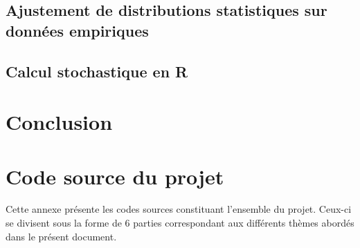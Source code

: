 \documentclass{report}
\begin{document}
\section{Ajustement de distributions statistiques sur données empiriques}
	

\section{Calcul stochastique en R}
	
	
\chapter*{Conclusion}
	




\appendix
\chapter{Code source du projet}
Cette annexe présente les codes sources constituant l'ensemble du projet. Ceux-ci se divisent sous la forme de 6 parties correspondant aux différents thèmes abordés dans le présent document. \\

\label{src:Benchmark}

\label{src:CaseStudyDevQ1}

\label{src:CaseStudyDevQ2}

\label{src:CaseStudyDevQ3}

\label{src:CaseStudyDevQ4}

\label{src:CaseStudyDevQ5}

\label{src:CaseStudyDevQ6}
\end{document}
